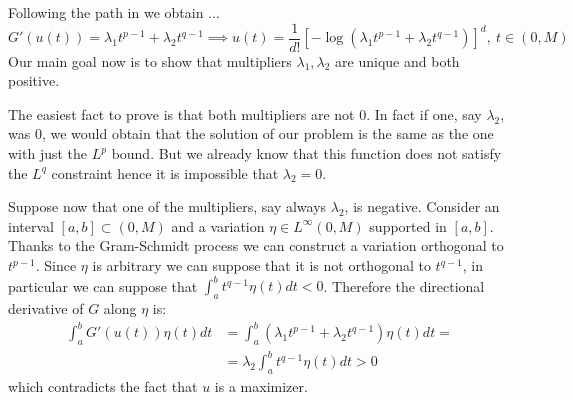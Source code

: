 \documentclass[corpo=11pt, stile=classica, tipotesi=custom,
greek, evenboxes, english]{toptesi}
\numberwithin{equation}{chapter}
\begin{document}
Following the path in \cite{nicolatilli_norm} we obtain ...\\
\begin{equation*}
	G'(u(t)) = \lambda_1 t^{p-1} + \lambda_2 t^{q-1} \implies u(t) = \dfrac{1}{d!}\left[-\log\left(\lambda_1 t^{p-1} + \lambda_2 t^{q-1}\right)\right]^d, \ t \in (0,M)
\end{equation*}
Our main goal now is to show that multipliers $\lambda_1, \lambda_2$ are unique and both positive.

The easiest fact to prove is that both multipliers are not 0. In fact if one, say $\lambda_2$, was 0, we would obtain that the solution of our problem is the same as the one with just the $L^p$ bound. But we already know that this function does not satisfy the $L^q$ constraint hence it is impossible that $\lambda_2=0$.

Suppose now that one of the multipliers, say always $\lambda_2$, is negative. Consider an interval $[a,b] \subset (0,M)$ and a variation $\eta \in L^{\infty}(0,M)$ supported in $[a,b]$. Thanks to the Gram-Schmidt process we can construct a variation orthogonal to $t^{p-1}$. Since $\eta$ is arbitrary we can suppose that it is not orthogonal to $t^{q-1}$, in particular we can suppose that $\int_{a}^{b}t^{q-1}\eta(t)dt <0$. Therefore the directional derivative of $G$ along $\eta$ is:
\begin{align*}
	\int_{a}^{b} G'(u(t))\eta(t)dt &= \int_{a}^{b} (\lambda_1 t^{p-1} + \lambda_2 t^{q-1})\eta(t)dt = \\
									   &= \lambda_2 \int_{a}^{b} t^{q-1} \eta(t)dt > 0
\end{align*}
which contradicts the fact that $u$ is a maximizer.
\end{document}
